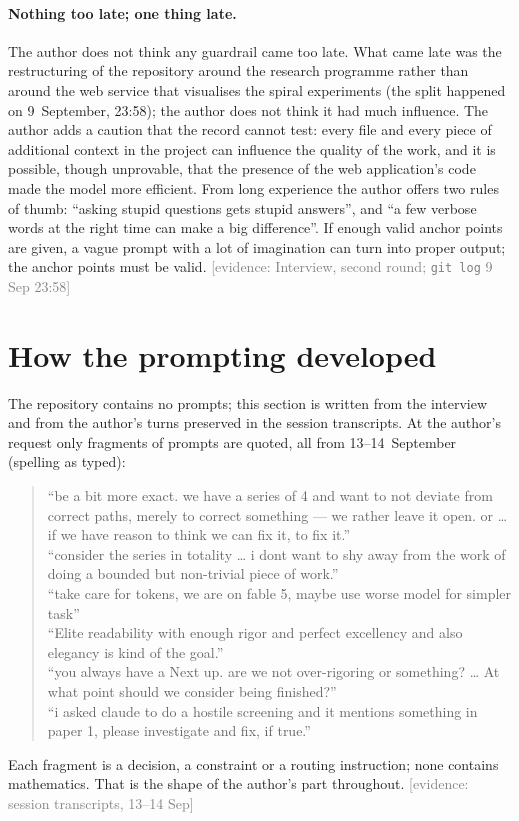 \documentclass[11pt,a4paper]{article}
\newcommand{\evidence}[1]{{\footnotesize\textcolor{Gray}{[evidence: #1]}}}
\begin{document}
\paragraph{Nothing too late; one thing late.} The author does not think any guardrail came too late. What came late
was the restructuring of the repository around the research programme rather than around the web service that
visualises the spiral experiments (the split happened on 9~September, 23:58); the author does not think it had much
influence. The author adds a caution that the record cannot test: every file and every piece of additional context
in the project can influence the quality of the work, and it is possible, though unprovable, that the presence of
the web application's code made the model more efficient. From long experience the author offers two rules of
thumb: ``asking stupid questions gets stupid answers'', and ``a few verbose words at the right time can make a big
difference''. If enough valid anchor points are given, a vague prompt with a lot of imagination can turn into proper
output; the anchor points must be valid. \evidence{Interview, second round; \texttt{git log} 9 Sep 23:58}

\section{How the prompting developed}\label{sec:prompting}

The repository contains no prompts; this section is written from the interview and from the author's turns
preserved in the session transcripts. At the author's request only fragments of prompts are quoted, all from
13--14~September (spelling as typed):
\begin{quote}\small
``be a bit more exact. we have a series of 4 and want to not deviate from correct paths, merely to correct
something --- we rather leave it open. or \dots{} if we have reason to think we can fix it, to fix it.''\\[2pt]
``consider the series in totality \dots{} i dont want to shy away from the work of doing a bounded but non-trivial
piece of work.''\\[2pt]
``take care for tokens, we are on fable 5, maybe use worse model for simpler task''\\[2pt]
``Elite readability with enough rigor and perfect excellency and also elegancy is kind of the goal.''\\[2pt]
``you always have a Next up. are we not over-rigoring or something? \dots{} At what point should we consider being
finished?''\\[2pt]
``i asked claude to do a hostile screening and it mentions something in paper 1, please investigate and fix, if
true.''
\end{quote}
Each fragment is a decision, a constraint or a routing instruction; none contains mathematics. That is the shape of
the author's part throughout. \evidence{session transcripts, 13--14 Sep}
\end{document}
